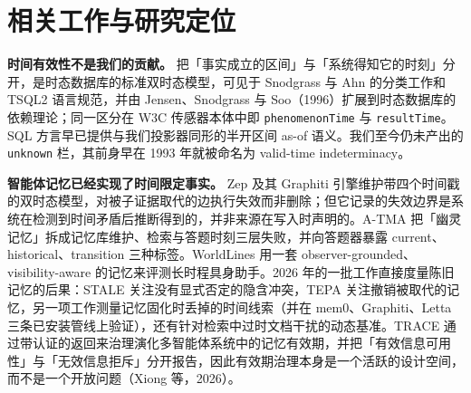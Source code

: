 \documentclass[UTF8,11pt]{ctexart}
\begin{document}
\section{相关工作与研究定位}
\noindent\textbf{时间有效性不是我们的贡献。} 把「事实成立的区间」与「系统得知它的时刻」分开，是时态数据库的标准双时态模型，可见于 Snodgrass 与 Ahn 的分类工作和 TSQL2 语言规范，并由 Jensen、Snodgrass 与 Soo（1996）扩展到时态数据库的依赖理论；同一区分在 W3C 传感器本体中即 \texttt{phenomenonTime} 与 \texttt{resultTime}。SQL 方言早已提供与我们投影器同形的半开区间 as-of 语义。我们至今仍未产出的 \texttt{unknown} 栏，其前身早在 1993 年就被命名为 valid-time indeterminacy。

\noindent\textbf{智能体记忆已经实现了时间限定事实。} Zep 及其 Graphiti 引擎维护带四个时间戳的双时态模型，对被子证据取代的边执行失效而非删除；但它记录的失效边界是系统在检测到时间矛盾后推断得到的，并非来源在写入时声明的。A-TMA 把「幽灵记忆」拆成记忆库维护、检索与答题时刻三层失败，并向答题器暴露 current、historical、transition 三种标签。WorldLines 用一套 observer-grounded、visibility-aware 的记忆来评测长时程具身助手。2026 年的一批工作直接度量陈旧记忆的后果：STALE 关注没有显式否定的隐含冲突，TEPA 关注撤销被取代的记忆，另一项工作测量记忆固化时丢掉的时间线索（并在 mem0、Graphiti、Letta 三条已安装管线上验证），还有针对检索中过时文档干扰的动态基准。TRACE 通过带认证的返回来治理演化多智能体系统中的记忆有效期，并把「有效信息可用性」与「无效信息拒斥」分开报告，因此有效期治理本身是一个活跃的设计空间，而不是一个开放问题（Xiong 等，2026）。
\end{document}
